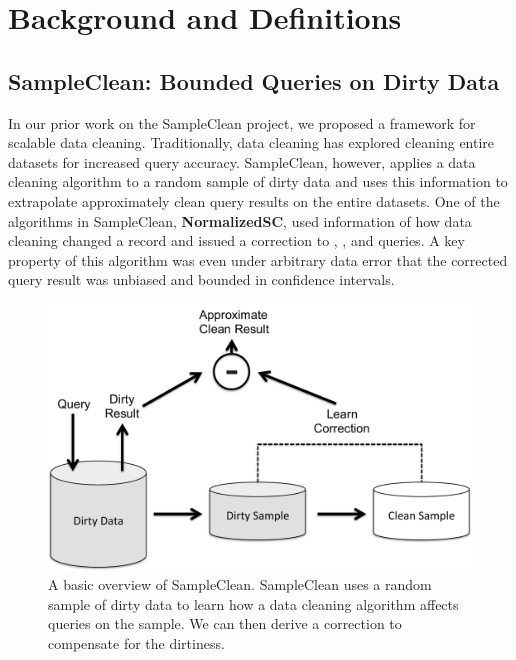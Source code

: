 \section{Background and Definitions}\label{sec-background}

\subsection{SampleClean: Bounded Queries on Dirty Data}
In our prior work on the SampleClean project, we proposed a framework for scalable data cleaning.
Traditionally, data cleaning has explored cleaning entire datasets for increased query accuracy.
SampleClean, however, applies a data cleaning algorithm to a random sample of dirty data and uses this information to extrapolate approximately clean query results on the entire datasets.
One of the algorithms in SampleClean, \textbf{NormalizedSC}, used information of how data cleaning changed a record and issued a correction to \sumfunc, \avgfunc, and \countfunc queries.
A key property of this algorithm was even under arbitrary data error that the corrected query result was unbiased and bounded in confidence intervals.

\begin{figure}[t] \vspace{-2em}
\centering
 \includegraphics[scale=0.30]{figs/sys-arch2.pdf} \vspace{-.25em}
 \caption{A basic overview of SampleClean. SampleClean uses a random sample of dirty data to learn how a data cleaning algorithm affects queries on the sample. We can then derive a correction to compensate for the dirtiness.}\vspace{-1.75em}
\end{figure}

